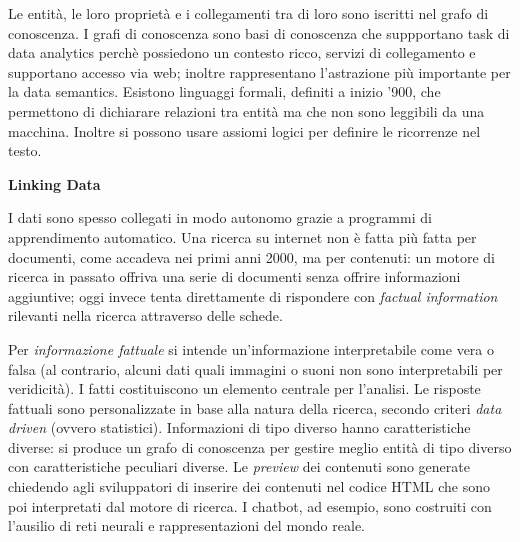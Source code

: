 \documentclass[11pt]{article}
\begin{document}
Le entità, le loro proprietà e i collegamenti tra di loro sono iscritti nel grafo di conoscenza. I grafi di conoscenza sono basi di conoscenza che suppportano task di data analytics perchè possiedono un contesto ricco, servizi di collegamento e supportano accesso via web; inoltre rappresentano l'astrazione più importante per la data semantics.
Esistono linguaggi formali, definiti a inizio '900, che permettono di dichiarare relazioni tra entità ma che non sono leggibili da una macchina.
Inoltre si possono usare assiomi logici per definire le ricorrenze nel testo.
\newline
\newline
\begin{itshape}
\textbf{Linking Data}
\end{itshape}

I dati sono spesso collegati in modo autonomo grazie a programmi di apprendimento automatico.
Una ricerca su internet non è fatta più fatta per documenti, come accadeva nei primi anni 2000, ma per contenuti: un motore di ricerca in passato offriva una serie di documenti senza offrire informazioni aggiuntive; oggi invece tenta direttamente di rispondere con \textit{factual information} rilevanti nella ricerca attraverso delle schede.

Per \textit{informazione fattuale} si intende un'informazione interpretabile come vera o falsa (al contrario, alcuni dati quali immagini o suoni non sono interpretabili per veridicità).
I fatti costituiscono un elemento centrale per l'analisi.
Le risposte fattuali sono personalizzate in base alla natura della ricerca, secondo criteri \textit{data driven} (ovvero statistici).
Informazioni di tipo diverso hanno caratteristiche diverse: si produce un grafo di conoscenza per gestire meglio entità di tipo diverso con caratteristiche peculiari diverse.
Le \textit{preview} dei contenuti sono generate chiedendo agli sviluppatori di inserire dei contenuti nel codice HTML che sono poi interpretati dal motore di ricerca. I chatbot, ad esempio, sono costruiti con l'ausilio di reti neurali e rappresentazioni del mondo reale.
\end{document}
